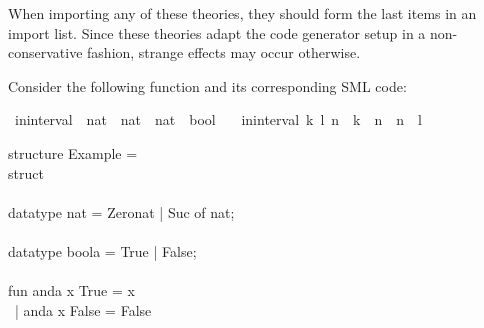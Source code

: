 \begin{isabellebody}
\begin{isamarkuptext}
  \begin{warn}
    When importing any of these theories, they should form the last
    items in an import list.  Since these theories adapt the
    code generator setup in a non-conservative fashion,
    strange effects may occur otherwise.
  \end{warn}%
\end{isamarkuptext}%
\isamarkuptrue%
%
\isamarkuptrue%
%
\begin{isamarkuptext}%
Consider the following function and its corresponding
  SML code:%
\end{isamarkuptext}%
\isamarkuptrue%
%
\isadelimquote
%
\endisadelimquote
%
\isatagquote
{}\isamarkupfalse%
\ in{\isacharunderscore}interval\ {\isacharcolon}{\isacharcolon}\ {\isachardoublequoteopen}nat\ {\isasymtimes}\ nat\ {\isasymRightarrow}\ nat\ {\isasymRightarrow}\ bool{\isachardoublequoteclose}\ \isanewline
\ \ {\isachardoublequoteopen}in{\isacharunderscore}interval\ {\isacharparenleft}k{\isacharcomma}\ l{\isacharparenright}\ n\ {\isasymlongleftrightarrow}\ k\ {\isasymle}\ n\ {\isasymand}\ n\ {\isasymle}\ l{\isachardoublequoteclose}%
\endisatagquote
{\isafoldquote}%
%
\isadelimquote
%
\endisadelimquote
%
\isadeliminvisible
%
\endisadeliminvisible
%
\isataginvisible
%
\endisataginvisible
{\isafoldinvisible}%
%
\isadeliminvisible
%
\endisadeliminvisible
%
\isadelimquote
%
\endisadelimquote
%
\isatagquote
%
\begin{isamarkuptext}%
\isatypewriter%
\noindent%
\hspace*{0pt}structure Example = \\
\hspace*{0pt}struct\\
\hspace*{0pt}\\
\hspace*{0pt}datatype nat = Zero{}nat | Suc of nat;\\
\hspace*{0pt}\\
\hspace*{0pt}datatype boola = True | False;\\
\hspace*{0pt}\\
\hspace*{0pt}fun anda x True = x\\
\hspace*{0pt} ~| anda x False = False\\

\end{isamarkuptext}
\end{isabellebody}
